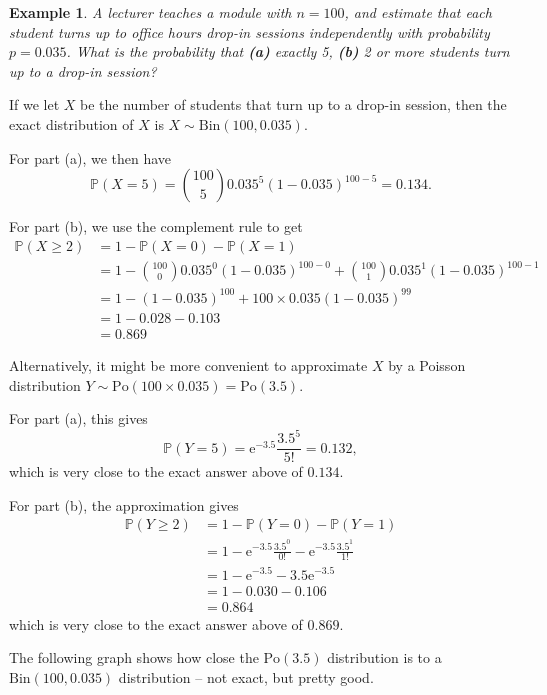\documentclass[
  a4paper,
]{book}
\theoremstyle{definition}
\theoremstyle{definition}
\newtheorem{example}{Example}[chapter]
\theoremstyle{definition}
\theoremstyle{definition}
\theoremstyle{remark}
\begin{document}
\begin{example}
\emph{A lecturer teaches a module with \(n = 100\), and estimate that each student turns up to office hours drop-in sessions independently with probability \(p = 0.035\). What is the probability that \textbf{(a)} exactly 5, \textbf{(b)} 2 or more students turn up to a drop-in session?}

If we let \(X\) be the number of students that turn up to a drop-in session, then the exact distribution of \(X\) is \(X \sim \text{Bin}(100, 0.035)\).

For part (a), we then have
\[ \mathbb P(X = 5) = \binom{100}{5} 0.035^5 (1 - 0.035)^{100-5} = 0.134 .  \]

For part (b), we use the complement rule to get
\begin{align*}
\mathbb P(X \geq 2)
&= 1 - \mathbb P(X = 0) - \mathbb P(X = 1) \\
&= 1 - \binom{100}{0} 0.035^0 (1 - 0.035)^{100-0} + \binom{100}{1} 0.035^1 (1 - 0.035)^{100 - 1} \\
&= 1 - (1 - 0.035)^{100} + 100 \times 0.035 (1 - 0.035)^{99} \\
&= 1 - 0.028 - 0.103 \\
&= 0.869
\end{align*}

Alternatively, it might be more convenient to approximate \(X\) by a Poisson distribution \(Y \sim \text{Po}(100 \times 0.035) = \text{Po}(3.5)\).

For part (a), this gives
\[ \mathbb P(Y = 5) = \mathrm e^{-3.5} \frac{3.5^5}{5!} = 0.132 ,  \]
which is very close to the exact answer above of \(0.134\).

For part (b), the approximation gives
\begin{align*}
\mathbb P(Y \geq 2)
&= 1 - \mathbb P(Y = 0) - \mathbb P(Y = 1) \\
&= 1 - \mathrm e^{-3.5} \frac{3.5^0}{0!} - \mathrm e^{-3.5} \frac{3.5^1}{1!} \\
&= 1 - \mathrm e^{-3.5} - 3.5 \mathrm e^{-3.5} \\
&= 1 - 0.030 - 0.106 \\
&= 0.864
\end{align*}
which is very close to the exact answer above of \(0.869\).

The following graph shows how close the \(\text{Po}(3.5)\) distribution is to a \(\text{Bin}(100, 0.035)\) distribution -- not exact, but pretty good.


\end{example}
\end{document}
